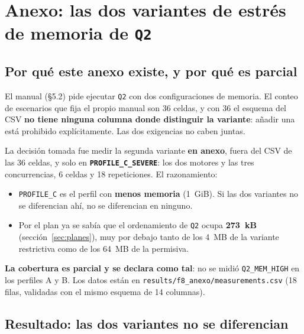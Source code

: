 
\section{Anexo: las dos variantes de estrés de memoria de \texttt{Q2}}
\label{sec:variantes-anexo}

\subsection{Por qué este anexo existe, y por qué es parcial}

El manual (§5.2) pide ejecutar \texttt{Q2} con dos configuraciones de memoria. El
conteo de escenarios que fija el propio manual son 36 celdas, y con 36 el esquema
del CSV \textbf{no tiene ninguna columna donde distinguir la variante}: añadir una
está prohibido explícitamente. Las dos exigencias no caben juntas.

La decisión tomada fue medir la segunda variante \textbf{en anexo}, fuera del CSV
de las 36 celdas, y solo en \textbf{\texttt{PROFILE\_C\_SEVERE}}: los dos motores y
las tres concurrencias, 6 celdas y 18 repeticiones. El razonamiento:

\begin{itemize}
  \item \texttt{PROFILE\_C} es el perfil con \textbf{menos memoria} (1~GiB). Si las
        dos variantes no se diferencian ahí, no se diferencian en ninguno.
  \item Por el plan ya se sabía que el ordenamiento de \texttt{Q2} ocupa
        \textbf{273~kB} (sección~\ref{sec:planes}), muy por debajo tanto de los
        4~MB de la variante restrictiva como de los 64~MB de la permisiva.
\end{itemize}

\textbf{La cobertura es parcial y se declara como tal}: no se midió
\texttt{Q2\_MEM\_HIGH} en los perfiles A y B. Los datos están en
\texttt{results/f8\_anexo/measurements.csv} (18 filas, validadas con el mismo
esquema de 14 columnas).

\subsection{Resultado: las dos variantes no se diferencian}

